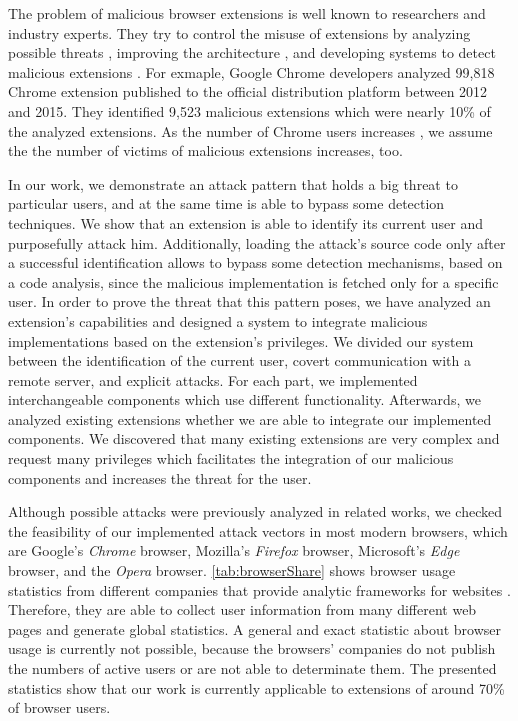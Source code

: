 	The problem of malicious browser extensions is well known to researchers and industry experts. They try to control the misuse of extensions by analyzing possible threats \cite{Liu12chromeextensions:, liu2011botnet, TerLouw:2007:EWB:1420581.1420583}, improving the architecture \cite{Barth10protectingbrowsers, Carlini:2012:EGC:2362793.2362800, cs2015sentinel, TerLouw:2007:EWB:1420581.1420583}, and developing systems to detect malicious extensions \cite{184485, 190984, Bandhakavi:2011:VBE:1995376.1995398}. For exmaple, Google Chrome developers analyzed 99,818 Chrome extension published to the official distribution platform between 2012 and 2015. They identified 9,523 malicious extensions which were nearly 10\% of the analyzed extensions. As the number of Chrome users increases \cite{w3browserStats, statcounter, netmarketshare}, we assume the the number of victims of malicious extensions increases, too.

	In our work, we demonstrate an attack pattern that holds a big threat to particular users, and at the same time is able to bypass some detection techniques. We show that an extension is able to identify its current user and purposefully attack him. Additionally, loading the attack's source code only after a successful identification allows to bypass some detection mechanisms, based on a code analysis, since the malicious implementation is fetched only for a specific user. In order to prove the threat that this pattern poses, we have analyzed an extension's capabilities and designed a system to integrate malicious implementations based on the extension's privileges. We divided our system between the identification of the current user, covert communication with a remote server, and explicit attacks. For each part, we implemented interchangeable components which use different functionality. Afterwards, we analyzed existing extensions whether we are able to integrate our implemented components. We discovered that many existing extensions are very complex and request many privileges which facilitates the integration of our malicious components and increases the threat for the user.
	
	Although possible attacks were previously analyzed in related works, we checked the feasibility of our implemented attack vectors in most modern browsers, which are Google's \textit{Chrome} browser, Mozilla's \textit{Firefox} browser, Microsoft's \textit{Edge} browser, and the \textit{Opera} browser. \autoref{tab:browserShare} shows browser usage statistics from different companies  that provide analytic frameworks for websites \cite{w3browserStats, statcounter, netmarketshare}. Therefore, they are able to collect user information from many different web pages and generate global statistics. A general and exact statistic about browser usage is currently not possible, because the browsers' companies do not publish the numbers of active users or are not able to determinate them. The presented statistics show that our work is currently applicable to extensions of around 70\% of browser users.

